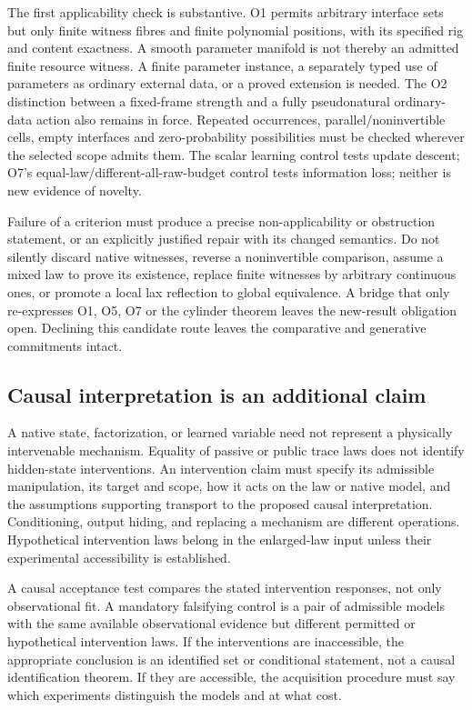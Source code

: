 \documentclass[11pt]{article}
\theoremstyle{remark}
\begin{document}
The first applicability check is substantive. O1 permits arbitrary interface sets but only finite witness fibres and finite polynomial positions, with its specified rig and content exactness. A smooth parameter manifold is not thereby an admitted finite resource witness. A finite parameter instance, a separately typed use of parameters as ordinary external data, or a proved extension is needed. The O2 distinction between a fixed-frame strength and a fully pseudonatural ordinary-data action also remains in force. Repeated occurrences, parallel/noninvertible cells, empty interfaces and zero-probability possibilities must be checked wherever the selected scope admits them. The scalar learning control tests update descent; O7's equal-law/different-all-raw-budget control tests information loss; neither is new evidence of novelty.

Failure of a criterion must produce a precise non-applicability or obstruction statement, or an explicitly justified repair with its changed semantics. Do not silently discard native witnesses, reverse a noninvertible comparison, assume a mixed law to prove its existence, replace finite witnesses by arbitrary continuous ones, or promote a local lax reflection to global equivalence. A bridge that only re-expresses O1, O5, O7 or the cylinder theorem leaves the new-result obligation open. Declining this candidate route leaves the comparative and generative commitments intact.

\subsection{Causal interpretation is an additional claim}

A native state, factorization, or learned variable need not represent a physically intervenable mechanism. Equality of passive or public trace laws does not identify hidden-state interventions. An intervention claim must specify its admissible manipulation, its target and scope, how it acts on the law or native model, and the assumptions supporting transport to the proposed causal interpretation. Conditioning, output hiding, and replacing a mechanism are different operations. Hypothetical intervention laws belong in the enlarged-law input unless their experimental accessibility is established.

A causal acceptance test compares the stated intervention responses, not only observational fit. A mandatory falsifying control is a pair of admissible models with the same available observational evidence but different permitted or hypothetical intervention laws. If the interventions are inaccessible, the appropriate conclusion is an identified set or conditional statement, not a causal identification theorem. If they are accessible, the acquisition procedure must say which experiments distinguish the models and at what cost.
\end{document}
